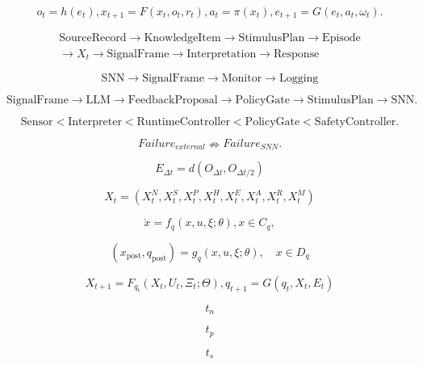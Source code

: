 
\[
o_{t} = h\left( e_{t} \right),x_{t + 1} = F\left( x_{t},o_{t},r_{t} \right),a_{t} = \pi\left( x_{t} \right),e_{t + 1} = G\left( e_{t},a_{t},\omega_{t} \right).
\]

\[
\begin{gathered}\text{SourceRecord}\to\text{KnowledgeItem}\to\text{StimulusPlan}\to\text{Episode}\\ \to X_t\to\text{SignalFrame}\to\text{Interpretation}\to\text{Response}\end{gathered}
\]

\[
\text{SNN} \rightarrow \text{SignalFrame} \rightarrow \text{Monitor} \rightarrow \text{Logging}
\]

\[
\text{SignalFrame} \rightarrow \text{LLM} \rightarrow \text{FeedbackProposal} \rightarrow \text{PolicyGate} \rightarrow \text{StimulusPlan} \rightarrow \text{SNN}.
\]

\[
\text{Sensor} < \text{Interpreter} < \text{RuntimeController} < \text{PolicyGate} < \text{SafetyController}.
\]

\[
{Failure}_{external} \nRightarrow {Failure}_{SNN}.
\]

\[
E_{\Delta t}=d\!\left(O_{\Delta t},O_{\Delta t/2}\right)
\]

\[
X_{t} = \left( X_{t}^{N},X_{t}^{S},X_{t}^{P},X_{t}^{H},X_{t}^{E},X_{t}^{A},X_{t}^{R},X_{t}^{M} \right)
\]

\[
\dot{x} = f_{q}(x,u,\xi;\theta),x \in C_{q},
\]

\[
(x_{\mathrm{post}},q_{\mathrm{post}})=g_q(x,u,\xi;\theta),\quad x\in D_q
\]

\[
X_{t + 1} = F_{q_{t}}\left( X_{t},U_{t},\Xi_{t};\Theta \right),q_{t + 1} = G\left( q_{t},X_{t},E_{t} \right)
\]

\[
t_{n}
\]

\[
t_{p}
\]

\[
t_{s}
\]

